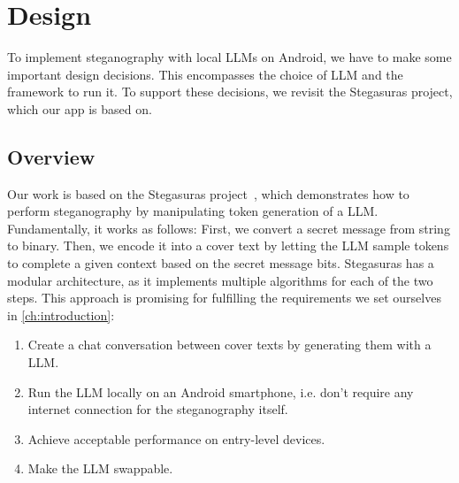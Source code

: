 
\chapter{Design}\label{ch:design}
\glsresetall %

To implement steganography with local \glspl{LLM} on Android, we have to make some important design decisions. This encompasses the choice of \gls{LLM} and the framework to run it. To support these decisions, we revisit the Stegasuras project, which our app is based on.

\section{Overview}
\label{sec:overview}
Our work is based on the Stegasuras project~\cite{zieglerNeuralLinguisticSteganography2019}, which demonstrates how to perform steganography by manipulating token generation of a \gls{LLM}. Fundamentally, it works as follows: First, we convert a secret message from string to binary. Then, we encode it into a cover text by letting the \gls{LLM} sample tokens to complete a given context based on the secret message bits. Stegasuras has a modular architecture, as it implements multiple algorithms for each of the two steps. This approach is promising for fulfilling the requirements we set ourselves in \cref{ch:introduction}:
\begin{enumerate}
    \item Create a chat conversation between cover texts by generating them with a \gls{LLM}.
    \item Run the \gls{LLM} locally on an Android smartphone, i.e. don't require any internet connection for the steganography itself.
    \item Achieve acceptable performance on entry-level devices.
    \item Make the \gls{LLM} swappable.
\end{enumerate}

